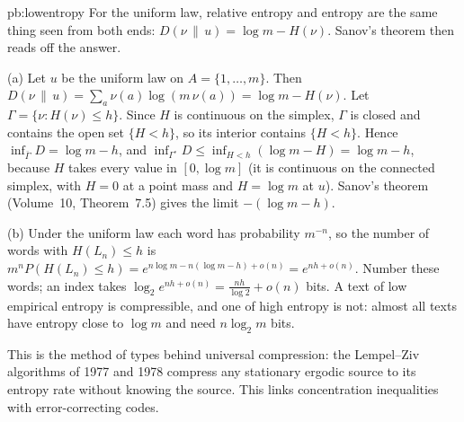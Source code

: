 \begin{solution}{pb:lowentropy}
\idea For the uniform law, relative entropy and entropy are the same thing seen from both ends: $D(\nu\,\|\,u)=\log m-H(\nu)$. Sanov's theorem then reads off the answer.

\writeup (a) Let $u$ be the uniform law on $A=\{1,\dots,m\}$. Then $D(\nu\,\|\,u)=\sum_a\nu(a)\log(m\,\nu(a))=\log m-H(\nu)$. Let $\Gamma=\{\nu:H(\nu)\le h\}$. Since $H$ is
continuous on the simplex, $\Gamma$ is closed and contains the open set $\{H<h\}$, so its interior contains $\{H<h\}$. Hence $\inf_{\overline\Gamma}D=\log m-h$, and
$\inf_{\Gamma^\circ}D\le\inf_{H<h}(\log m-H)=\log m-h$, because $H$ takes every value in $[0,\log m]$ (it is continuous on the connected simplex, with $H=0$ at a point mass and
$H=\log m$ at $u$). Sanov's theorem (Volume~10, Theorem~7.5) gives the limit $-(\log m-h)$.

(b) Under the uniform law each word has probability $m^{-n}$, so the number of words with $H(L_n)\le h$ is $m^nP(H(L_n)\le h)=e^{n\log m-n(\log m-h)+o(n)}=e^{nh+o(n)}$. Number
these words; an index takes $\log_2e^{nh+o(n)}=\frac{nh}{\log2}+o(n)$ bits. A text of low empirical entropy is compressible, and one of high entropy is not: almost all texts
have entropy close to $\log m$ and need $n\log_2m$ bits.

\leads This is the method of types behind universal compression: the Lempel--Ziv algorithms of 1977 and 1978 compress any stationary ergodic source to its entropy rate
without knowing the source. This links concentration inequalities with error-correcting codes.
\end{solution}

